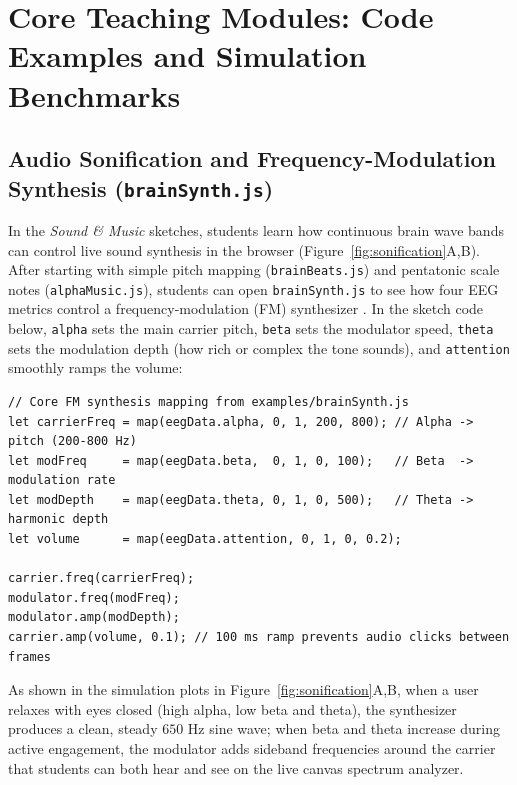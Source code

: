 \documentclass[11pt]{article}
\begin{document}
\section{Core Teaching Modules: Code Examples and Simulation Benchmarks}

\subsection{Audio Sonification and Frequency-Modulation Synthesis (\texttt{brainSynth.js})}
In the \emph{Sound \& Music} sketches, students learn how continuous brain wave bands can control live sound synthesis in the browser (Figure~\ref{fig:sonification}A,B). After starting with simple pitch mapping (\texttt{brainBeats.js}) and pentatonic scale notes (\texttt{alphaMusic.js}), students can open \texttt{brainSynth.js} to see how four EEG metrics control a frequency-modulation (FM) synthesizer \citep{chowning1973synthesis}. In the sketch code below, \texttt{alpha} sets the main carrier pitch, \texttt{beta} sets the modulator speed, \texttt{theta} sets the modulation depth (how rich or complex the tone sounds), and \texttt{attention} smoothly ramps the volume:

\noindent\begin{minipage}{\textwidth}
\begin{lstlisting}
// Core FM synthesis mapping from examples/brainSynth.js
let carrierFreq = map(eegData.alpha, 0, 1, 200, 800); // Alpha -> pitch (200-800 Hz)
let modFreq     = map(eegData.beta,  0, 1, 0, 100);   // Beta  -> modulation rate
let modDepth    = map(eegData.theta, 0, 1, 0, 500);   // Theta -> harmonic depth
let volume      = map(eegData.attention, 0, 1, 0, 0.2);

carrier.freq(carrierFreq);
modulator.freq(modFreq);
modulator.amp(modDepth);
carrier.amp(volume, 0.1); // 100 ms ramp prevents audio clicks between frames
\end{lstlisting}
\end{minipage}
\vspace{4pt}

As shown in the simulation plots in Figure~\ref{fig:sonification}A,B, when a user relaxes with eyes closed (high alpha, low beta and theta), the synthesizer produces a clean, steady $650\text{ Hz}$ sine wave; when beta and theta increase during active engagement, the modulator adds sideband frequencies around the carrier that students can both hear and see on the live canvas spectrum analyzer.
\end{document}
